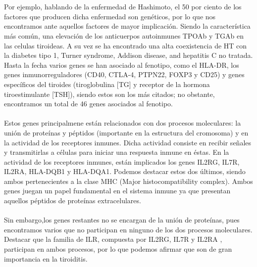 \\  \\ 
 Por ejemplo, hablando de la enfermedad de Hashimoto, el 50 por ciento de los factores que producen dicha enfermedad son genéticos, por lo que nos encontramos ante aquellos factores de mayor implicación. Siendo la característica más común, una elevación de los anticuerpos autoinmunes TPOAb y TGAb en las celulas tiroideas.\cite{Zheng2020} A su vez se ha encontrado una alta coexistencia de HT con la diabetes tipo 1, Turner syndrome, Addison disease, and  hepatitis C no tratada.\cite{Sweeney2014}
\\ \newpage
Hasta la fecha varios genes se han asociado al fenotipo, como el HLA-DR, los genes inmunorreguladores (CD40, CTLA-4, PTPN22, FOXP3 y CD25) y genes específicos del tiroides (tiroglobulina [TG] y receptor de la hormona tiroestimulante [TSH]), siendo estos son los más citados; no obstante, encontramos un total de 46 genes asociados al fenotipo. 
\\ \\
Estos genes principalmene están relacionados con dos procesos moleculares: la unión de proteínas y péptidos (importante en la estructura del cromosoma) y en la actividad de los receptores inmunes. Dicha actividad consiste en recibir señales y transmitirlas a células para iniciar una respuesta inmune en éstas.
\cite{Hiromatsu}
En la actividad de los receptores inmunes, están implicados los genes IL2RG, IL7R, IL2RA, HLA-DQB1 y HLA-DQA1. Podemos destacar estos dos últimos, siendo ambos pertenecientes a la clase MHC (Major histocompatibility complex). Ambos genes juegan un papel fundamental en el sistema inmune ya que presentan aquellos péptidos de proteínas extracelulares. \cite{HLA} 
\\ \\
Sin embargo,los genes restantes no se encargan de la unión de proteínas, pues encontramos varios que no participan en ninguno de los dos procesos moleculares. Destacar que  la familia de ILR, compuesta por IL2RG, IL7R y IL2RA , participan en ambos procesos, por lo que podemos afirmar que son de gran importancia en la tiroiditis. 


